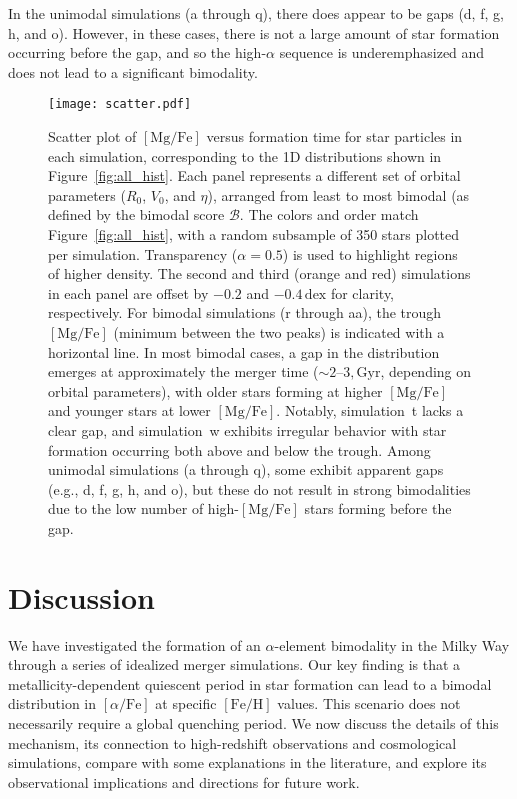 \documentclass[twocolumn,linenumbers,trackchanges]{aastex631}
\newcommand{\Gyr}{\ensuremath{\textrm{Gyr}}}
\newcommand{\FeH}{\ensuremath{[\textrm{Fe}/\textrm{H}]}}
\newcommand{\MgFe}{\ensuremath{[\textrm{Mg}/\textrm{Fe}]}}
\newcommand{\alphaFe}{\ensuremath{[\alpha/\textrm{Fe}]}}
\newcommand{\dex}{\ensuremath{\textrm{dex}}}
\begin{document}
In the unimodal simulations (a through q), there does appear to be gaps (d, f, g, h, and o). However, in these cases, there is not a large amount of star formation occurring before the gap, and so the high-$\alpha$ sequence is underemphasized and does not lead to a significant bimodality.

\begin{figure*}
  \centering
  \texttt{[image: scatter.pdf]}
  \caption{Scatter plot of \MgFe{} versus formation time for star particles in each simulation, corresponding to the 1D distributions shown in Figure~\ref{fig:all_hist}. Each panel represents a different set of orbital parameters ($R_0$, $V_0$, and $\eta$), arranged from least to most bimodal (as defined by the bimodal score $\mathcal{B}$. The colors and order match Figure~\ref{fig:all_hist}, with a random subsample of 350 stars plotted per simulation. Transparency ($\alpha=0.5$) is used to highlight regions of higher density. The second and third (orange and red) simulations in each panel are offset by $-0.2$ and $-0.4\,\dex$ for clarity, respectively. For bimodal simulations (r through aa), the trough \MgFe{} (minimum between the two peaks) is indicated with a horizontal line. In most bimodal cases, a gap in the distribution emerges at approximately the merger time ($\sim2$--$3,\Gyr$, depending on orbital parameters), with older stars forming at higher \MgFe{} and younger stars at lower \MgFe{}. Notably, simulation~t lacks a clear gap, and simulation~w exhibits irregular behavior with star formation occurring both above and below the trough. Among unimodal simulations (a through q), some exhibit apparent gaps (e.g., d, f, g, h, and o), but these do not result in strong bimodalities due to the low number of high-\MgFe{} stars forming before the gap.}
  \label{fig:all_scatter}
\end{figure*}

\section{Discussion}\label{sec:discussion}
We have investigated the formation of an $\alpha$-element bimodality in the Milky Way through a series of idealized merger simulations. Our key finding is that a metallicity-dependent quiescent period in star formation can lead to a bimodal distribution in \alphaFe{} at specific \FeH{} values. This scenario does not necessarily require a global quenching period. We now discuss the details of this mechanism, its connection to high-redshift observations and cosmological simulations, compare with some explanations in the literature, and explore its observational implications and directions for future work.
\end{document}
